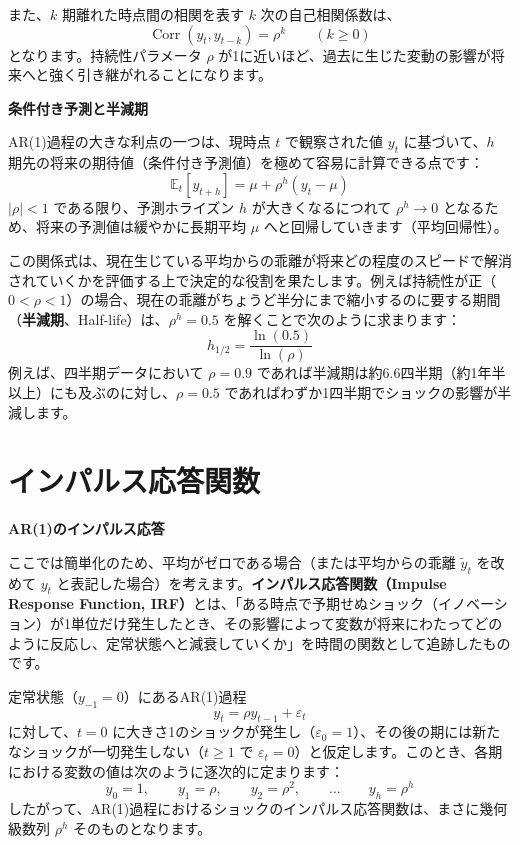 \documentclass[
  japanese,
  lualatex,
  ja=standard,
  12pt,
  a4paper]{ltjsarticle}
\begin{document}
また、\(k\) 期離れた時点間の相関を表す \(k\) 次の自己相関係数は、 \[
\operatorname{Corr}(y_t,y_{t-k})=\rho^k \qquad (k\geq0)
\] となります。持続性パラメータ \(\rho\)
が1に近いほど、過去に生じた変動の影響が将来へと強く引き継がれることになります。


\textbf{条件付き予測と半減期}

AR(1)過程の大きな利点の一つは、現時点 \(t\) で観察された値 \(y_t\)
に基づいて、\(h\)
期先の将来の期待値（条件付き予測値）を極めて容易に計算できる点です： \[
\mathbb{E}_t[y_{t+h}]
=
\mu+\rho^h(y_t-\mu)
\] \(|\rho|<1\) である限り、予測ホライズン \(h\) が大きくなるにつれて
\(\rho^h \to 0\) となるため、将来の予測値は緩やかに長期平均 \(\mu\)
へと回帰していきます（平均回帰性）。

この関係式は、現在生じている平均からの乖離が将来どの程度のスピードで解消されていくかを評価する上で決定的な役割を果たします。例えば持続性が正（\(0<\rho<1\)）の場合、現在の乖離がちょうど半分にまで縮小するのに要する期間（\textbf{半減期}、Half-life）は、\(\rho^h = 0.5\)
を解くことで次のように求まります： \[
h_{1/2}
=
\frac{\ln(0.5)}{\ln(\rho)}
\] 例えば、四半期データにおいて \(\rho=0.9\)
であれば半減期は約6.6四半期（約1年半以上）にも及ぶのに対し、\(\rho=0.5\)
であればわずか1四半期でショックの影響が半減します。

\section{インパルス応答関数}\label{ux30a4ux30f3ux30d1ux30ebux30b9ux5fdcux7b54ux95a2ux6570}

\textbf{AR(1)のインパルス応答}

ここでは簡単化のため、平均がゼロである場合（または平均からの乖離
\(\tilde{y}_t\) を改めて \(y_t\)
と表記した場合）を考えます。\textbf{インパルス応答関数（Impulse Response
Function,
IRF）}とは、「ある時点で予期せぬショック（イノベーション）が1単位だけ発生したとき、その影響によって変数が将来にわたってどのように反応し、定常状態へと減衰していくか」を時間の関数として追跡したものです。

定常状態（\(y_{-1}=0\)）にあるAR(1)過程 \[
y_t=\rho y_{t-1}+\varepsilon_t
\] に対して、\(t=0\)
に大きさ1のショックが発生し（\(\varepsilon_0=1\)）、その後の期には新たなショックが一切発生しない（\(t\geq 1\)
で
\(\varepsilon_t=0\)）と仮定します。このとき、各期における変数の値は次のように逐次的に定まります：
\[
y_0=1,\qquad
y_1=\rho,\qquad
y_2=\rho^2,\qquad \ldots \qquad
y_h=\rho^h
\]
したがって、AR(1)過程におけるショックのインパルス応答関数は、まさに幾何級数列
\(\rho^h\) そのものとなります。
\end{document}
